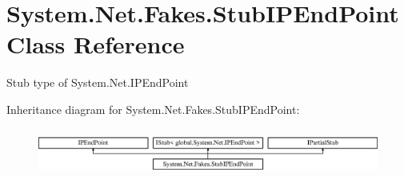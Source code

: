 \hypertarget{class_system_1_1_net_1_1_fakes_1_1_stub_i_p_end_point}{\section{System.\-Net.\-Fakes.\-Stub\-I\-P\-End\-Point Class Reference}
\label{class_system_1_1_net_1_1_fakes_1_1_stub_i_p_end_point}
}


Stub type of System.\-Net.\-I\-P\-End\-Point 


Inheritance diagram for System.\-Net.\-Fakes.\-Stub\-I\-P\-End\-Point\-:\begin{figure}[H]
\begin{center}
\leavevmode
\includegraphics[height=1.568627cm]{class_system_1_1_net_1_1_fakes_1_1_stub_i_p_end_point}
\end{center}
\end{figure}
